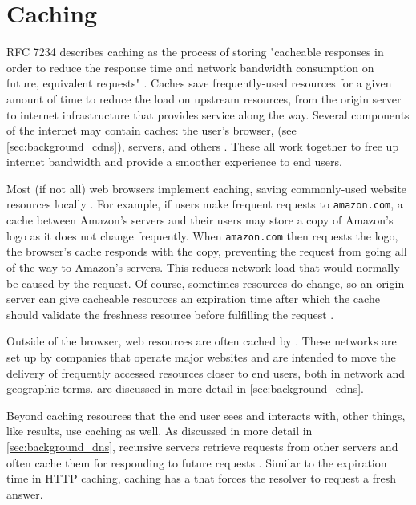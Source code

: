 \section{Caching}\label{sec:background_caching}

RFC 7234 describes caching as the process of storing "cacheable responses in order to reduce the response time and network bandwidth consumption on future, equivalent requests" \cite{rfc7234}. Caches save frequently-used resources for a given amount of time to reduce the load on upstream resources, from the origin server to internet infrastructure that provides service along the way. Several components of the internet may contain caches: the user's browser, \cdns (see \cref{sec:background_cdns}), \dns servers, and others \cite{MozillaFoundation2019HTTPCaching}. These all work together to free up internet bandwidth and provide a smoother experience to end users.

Most (if not all) web browsers implement \http caching, saving commonly-used website resources locally \cite{Grigorik2019HTTPCaching}. For example, if users make frequent requests to \texttt{amazon.com}, a cache between Amazon's servers and their users may store a copy of Amazon's logo as it does not change frequently. When \texttt{amazon.com} then requests the logo, the browser's cache responds with the copy, preventing the request from going all of the way to Amazon's servers. This reduces network load that would normally be caused by the request. Of course, sometimes resources do change, so an origin server can give cacheable resources an expiration time after which the cache should validate the freshness resource before fulfilling the request \cite{rfc7234}. 

Outside of the browser, web resources are often cached by \cdns. These networks are set up by companies that operate major websites and are intended to move the delivery of frequently accessed resources closer to end users, both in network and geographic terms. \cdns are discussed in more detail in \cref{sec:background_cdns}.

Beyond caching resources that the end user sees and interacts with, other things, like \dns results, use caching as well. As discussed in more detail in \autoref{sec:background_dns}, recursive \dns servers retrieve requests from other \dns servers and often cache them for responding to future requests \cite{rfc1035}. Similar to the expiration time in HTTP caching, \dns caching has a \ttl that forces the \dns resolver to request a fresh answer.